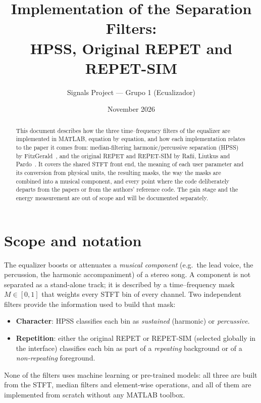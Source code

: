 \documentclass[11pt,a4paper]{article}
\title{Implementation of the Separation Filters:\\
HPSS, Original REPET and REPET-SIM}
\author{Signals Project --- Grupo 1 (Ecualizador)}
\date{November 2026}
\begin{document}
\maketitle

\begin{abstract}
This document describes how the three time--frequency filters of the
equalizer are implemented in MATLAB, equation by equation, and how each
implementation relates to the paper it comes from: median-filtering
harmonic/percussive separation (HPSS) by FitzGerald~\cite{fitzgerald2010},
and the original REPET and REPET-SIM by Rafii, Liutkus and
Pardo~\cite{rafii2014,rafii2013,rafii2012}. It covers the shared STFT
front end, the meaning of each user parameter and its conversion from
physical units, the resulting masks, the way the masks are combined into a
musical component, and every point where the code deliberately departs
from the papers or from the authors' reference code. The gain stage and the
energy measurement are out of scope and will be documented separately.
\end{abstract}

\tableofcontents
\bigskip

\section{Scope and notation}

The equalizer boosts or attenuates a \emph{musical component} (e.g.\ the
lead voice, the percussion, the harmonic accompaniment) of a stereo song.
A component is not separated as a stand-alone track; it is described by a
time--frequency mask $M\in[0,1]$ that weights every STFT bin of every
channel. Two independent filters provide the information used to build that
mask:

\begin{itemize}[nosep]
  \item \textbf{Character}: HPSS classifies each bin as \emph{sustained}
        (harmonic) or \emph{percussive}.
  \item \textbf{Repetition}: either the original REPET or REPET-SIM
        (selected globally in the interface) classifies each bin as part of a
        \emph{repeating} background or of a \emph{non-repeating} foreground.
\end{itemize}

None of the filters uses machine learning or pre-trained models: all three
are built from the STFT, median filters and element-wise operations, and
all of them are implemented from scratch without any MATLAB toolbox.
\end{document}
